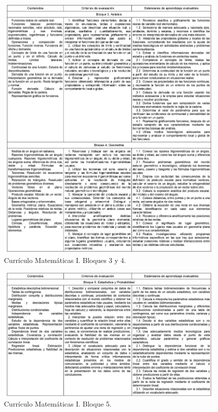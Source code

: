 \documentclass[a4paper, openright, 11pt, titlepage]{report}
\theoremstyle{definition}\newtheorem{defin}[propo]{Definition}
\theoremstyle{definition}\newtheorem{obser}[propo]{Remark}
\theoremstyle{definition}\newtheorem{ejem}[propo]{Ejemplo}
\theoremstyle{definition}\newtheorem{algoritmo}[propo]{Algoritmo}
\begin{document}
  \begin{figure}[H]
     \centering
     \includegraphics[width = 1.1\textwidth]{curriculo3.png}
     \caption{Currículo Matemáticas I. Bloques 3 y 4.}
 \end{figure}
  \begin{figure}[H]
     \centering
     \includegraphics[width = 1.1\textwidth]{curriculo4.png}
     \caption{Currículo Matemáticas I. Bloque 5.}
 \end{figure}
\end{document}
